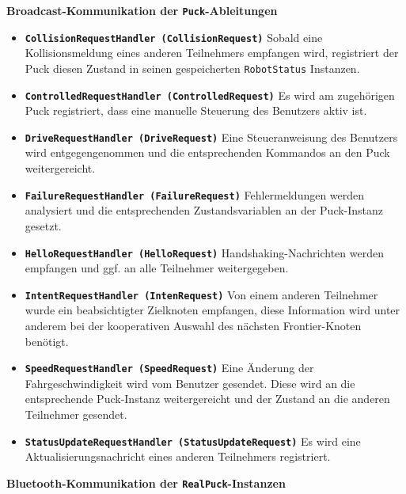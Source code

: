 \documentclass[10pt,a4paper]{article}
\begin{document}
		 	\textbf{Broadcast-Kommunikation der \texttt{Puck}-Ableitungen}
			\begin{itemize}
				\item \textbf{\texttt{CollisionRequestHandler (CollisionRequest)}} Sobald eine Kollisionsmeldung eines anderen Teilnehmers empfangen wird,
					registriert der Puck diesen Zustand in seinen gespeicherten \texttt{RobotStatus} Instanzen.
				\item \textbf{\texttt{ControlledRequestHandler (ControlledRequest)}} Es wird am zugehörigen Puck registriert, dass eine manuelle Steuerung
					des Benutzers aktiv ist.
				\item \textbf{\texttt{DriveRequestHandler (DriveRequest)}} Eine Steueranweisung des Benutzers wird entgegengenommen und die entsprechenden
					Kommandos an den Puck weitergereicht.
				\item \textbf{\texttt{FailureRequestHandler (FailureRequest)}} Fehlermeldungen werden analysiert und die entsprechenden Zustandsvariablen
					an der Puck-Instanz gesetzt.		
				\item \textbf{\texttt{HelloRequestHandler (HelloRequest)}} Handshaking-Nachrichten werden empfangen und ggf. an alle Teilnehmer weitergegeben.	
				\item \textbf{\texttt{IntentRequestHandler (IntenRequest)}} Von einem anderen Teilnehmer wurde ein beabsichtigter Zielknoten empfangen, diese
					Information wird unter anderem bei der kooperativen Auswahl des nächsten Frontier-Knoten benötigt.
				\item \textbf{\texttt{SpeedRequestHandler (SpeedRequest)}} Eine Änderung der Fahrgeschwindigkeit wird vom Benutzer gesendet. Diese wird an
					die entsprechende Puck-Instanz weitergereicht und der Zustand an die anderen Teilnehmer gesendet.				
				\item \textbf{\texttt{StatusUpdateRequestHandler (StatusUpdateRequest)}} Es wird eine Aktualisierungsnachricht eines anderen Teilnehmers
					registriert.		
			\end{itemize}  
		 	\textbf{Bluetooth-Kommunikation der \texttt{RealPuck}-Instanzen}
\end{document}
